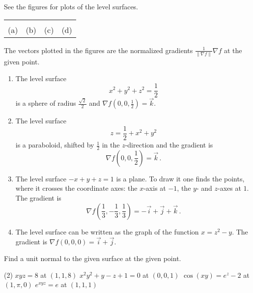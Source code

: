 \begin{solution}
See the figures for plots of the level surfaces.

\begin{center}
\begin{tabu} to \linewidth {X[1,c] X[1,c] X[1,c] X[1,c]}
 &
 &
 &
 \\
(a) & 
(b) & 
(c) &
(d)
\end{tabu}
\end{center}

The vectors plotted in the figures are the normalized gradients $\frac{1}{\| \nabla f\|} \nabla f$ at the given point.


\begin{enumerate}
\item
The level surface 
\[
x^2 + y^2 + z^2 = \frac 12
\] 
is a sphere of radius $\frac{\sqrt{2}}2$ and
$\nabla f\left(0,0,\frac 12\right) = \vec k$.
\item
The level surface 
\[
z = \frac 12 + x^2 + y^2
\]
is a paraboloid, shifted by $\frac 12$ in the $z$-direction and the gradient is
\[
\nabla f\left(0,0,\frac 12\right) = \vec k\,.
\]

\item
The level surface $-x + y + z = 1$ is a plane. To draw it one finds the points, where it crosses the coordinate axes: the $x$-axis at $-1$, the $y$- and $z$-axes at $1$. The gradient is 
\[
\nabla f\left(\frac 13,-\frac 13,\frac 13\right) = -\vec i + \vec j + \vec k\,.
\]

\item
The level surface can be written as the graph of the function $x= z^2 - y$. The gradient is $\nabla f(0,0,0) = \vec i + \vec j$.
\end{enumerate}
\end{solution}

\begin{question}
Find a unit normal to the given surface at the given point.
\begin{tasks}(2)
\task
$xyz=8$ at $(1,1,8)$
\task
$x^2y^2+y-z+1=0$ at $(0,0,1)$
\task
$\cos(xy)= e^z - 2$ at $(1, \pi, 0)$
\task
$e^{xyz} = e$ at $(1,1,1)$
\end{tasks}
\end{question}

